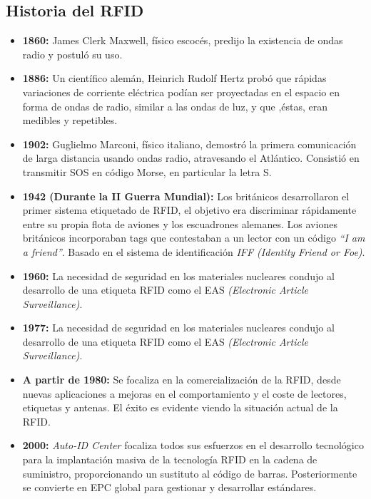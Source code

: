 \label{sec:2_marcoteorico}

\subsection{Historia del RFID}

\begin{itemize}
\item \textbf{1860:} James Clerk Maxwell, físico escocés, predijo la existencia de ondas radio y postuló su uso.

\item \textbf{1886:} Un científico alemán, Heinrich Rudolf Hertz probó que rápidas variaciones de corriente 	eléctrica podían ser proyectadas en el espacio en forma de ondas de radio, similar a las ondas de luz, y que ,éstas, eran medibles y repetibles.

\item \textbf{1902:} Guglielmo Marconi, físico italiano, demostró la primera comunicación de larga distancia usando ondas radio, atravesando el Atlántico. Consistió en transmitir SOS en código Morse, en particular la letra S.

\item \textbf{1942 (Durante la II Guerra Mundial):} Los británicos desarrollaron el primer sistema etiquetado de RFID, el objetivo era discriminar rápidamente entre su propia flota de aviones y los escuadrones alemanes. Los aviones británicos incorporaban tags que contestaban a un lector con un código \textit{“I am a friend”}. Basado en el sistema de identificación \textit{IFF (Identity Friend or Foe)}.

\item \textbf{1960:} La necesidad de seguridad en los materiales nucleares condujo al desarrollo de una etiqueta RFID como el EAS \textit{(Electronic Article Surveillance)}.

\item \textbf{1977:} La necesidad de seguridad en los materiales nucleares condujo al desarrollo de una etiqueta RFID como el EAS \textit{(Electronic Article Surveillance)}.

\item \textbf{A partir de 1980:} Se focaliza en la comercialización de la RFID, desde nuevas aplicaciones a mejoras en el comportamiento y el coste de lectores, etiquetas y antenas. El éxito es evidente viendo la situación actual de la RFID.

\item \textbf{2000:} \textit{Auto-ID Center} focaliza todos sus esfuerzos en el desarrollo tecnológico para la 	implantación masiva de la tecnología RFID en la cadena de suministro, proporcionando un sustituto al código de barras. Posteriormente se convierte en EPC global para gestionar y desarrollar estándares.

\end{itemize}


